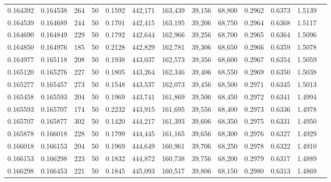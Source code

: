 \begin{tabular}{rrrrrrrrrrrrr}
0.164392 & 0.164538 &   264 &  50 &                                     0.1592 & 442,171 & 163,439 &  39,156 &  68,800 & 0.2962 & 0.6373 & 1.5139 \\
0.164539 & 0.164689 &   244 &  50 &                                     0.1701 & 442,415 & 163,195 &  39,206 &  68,750 & 0.2964 & 0.6368 & 1.5117 \\
0.164690 & 0.164849 &   229 &  50 &                                     0.1792 & 442,644 & 162,966 &  39,256 &  68,700 & 0.2965 & 0.6364 & 1.5096 \\
0.164850 & 0.164976 &   185 &  50 &                                     0.2128 & 442,829 & 162,781 &  39,306 &  68,650 & 0.2966 & 0.6359 & 1.5078 \\
0.164977 & 0.165118 &   208 &  50 &                                     0.1938 & 443,037 & 162,573 &  39,356 &  68,600 & 0.2967 & 0.6354 & 1.5059 \\
0.165120 & 0.165276 &   227 &  50 &                                     0.1805 & 443,264 & 162,346 &  39,406 &  68,550 & 0.2969 & 0.6350 & 1.5038 \\
0.165277 & 0.165457 &   273 &  50 &                                     0.1548 & 443,537 & 162,073 &  39,456 &  68,500 & 0.2971 & 0.6345 & 1.5013 \\
0.165458 & 0.165593 &   204 &  50 &                                     0.1969 & 443,741 & 161,869 &  39,506 &  68,450 & 0.2972 & 0.6341 & 1.4994 \\
0.165593 & 0.165707 &   174 &  50 &                                     0.2232 & 443,915 & 161,695 &  39,556 &  68,400 & 0.2973 & 0.6336 & 1.4978 \\
0.165707 & 0.165877 &   302 &  50 &                                     0.1420 & 444,217 & 161,393 &  39,606 &  68,350 & 0.2975 & 0.6331 & 1.4950 \\
0.165878 & 0.166018 &   228 &  50 &                                     0.1799 & 444,445 & 161,165 &  39,656 &  68,300 & 0.2976 & 0.6327 & 1.4929 \\
0.166018 & 0.166153 &   204 &  50 &                                     0.1969 & 444,649 & 160,961 &  39,706 &  68,250 & 0.2978 & 0.6322 & 1.4910 \\
0.166153 & 0.166298 &   223 &  50 &                                     0.1832 & 444,872 & 160,738 &  39,756 &  68,200 & 0.2979 & 0.6317 & 1.4889 \\
0.166298 & 0.166453 &   221 &  50 &                                     0.1845 & 445,093 & 160,517 &  39,806 &  68,150 & 0.2980 & 0.6313 & 1.4869 \\

\end{tabular}

